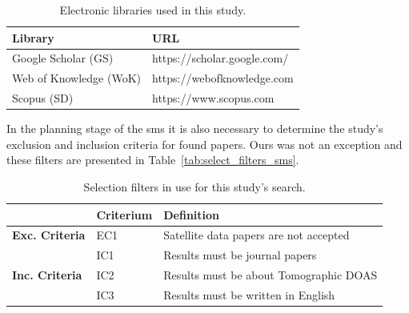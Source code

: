 \begin{table}[htb]
\centering
\caption{Electronic libraries used in this study.}
\label{tab:libraries}
    \begin{tabularx}{\textwidth}{ll}
        \toprule
        \textbf{Library}          & \textbf{URL}\\
        \midrule
        Google Scholar (GS)   & https://scholar.google.com/\\
        Web of Knowledge (WoK)& https://webofknowledge.com\\
        Scopus (SD)   & https://www.scopus.com\\
        \bottomrule
    \end{tabularx}
\end{table}

In the planning stage of the \gls{sms} it is also necessary to determine
the study's exclusion and inclusion criteria for found papers. Ours was
not an exception and these filters are presented in
Table~\ref{tab:select_filters_sms}.

\begin{table}[htb]
\centering
\caption{Selection filters in use for this study's search.}
\label{tab:select_filters}
\begin{tabularx}{\textwidth}{lXl}%
\toprule
\multicolumn{1}{l}{} & \textbf{Criterium} & \textbf{Definition} \\ \midrule
\multirow{1}{*}{\textbf{Exc. Criteria}} & EC1 & Satellite data papers
are not accepted \\
\midrule
\multicolumn{1}{l}{\multirow{3}{*}{\textbf{Inc. Criteria}}} & IC1 &
Results must be journal papers \\
\multicolumn{1}{l}{} & IC2 & Results must be about Tomographic DOAS \\ 
\multicolumn{1}{l}{} & IC3 & Results must be written in English \\
\bottomrule
\end{tabularx}
\end{table}
